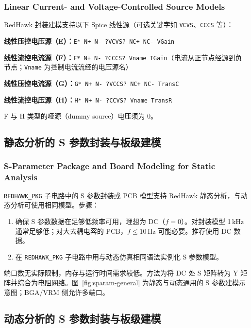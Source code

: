 \subsubsection*{Linear Current- and Voltage-Controlled Source Models}

RedHawk 封装建模支持以下 Spice 线性源（可选关键字如 \texttt{VCVS}、\texttt{CCCS} 等）：

\textbf{线性压控电压源（E）：}\texttt{E* N+ N- ?VCVS? NC+ NC- VGain}

\textbf{线性流控电流源（F）：}\texttt{F* N+ N- ?CCCS? Vname IGain}（电流从正节点经源到负节点；\texttt{Vname} 为控制电流流经的电压源名）

\textbf{线性压控电流源（G）：}\texttt{G* N+ N- ?VCCS? NC+ NC- TransC}

\textbf{线性流控电压源（H）：}\texttt{H* N+ N- ?CCVS? Vname TransR}

\begin{noteBox}
F 与 H 类型的哑源（dummy source）电压须为 0。
\end{noteBox}

\subsection{静态分析的 S 参数封装与板级建模}
\subsubsection*{S-Parameter Package and Board Modeling for Static Analysis}

\texttt{REDHAWK\_PKG} 子电路中的 S 参数封装或 PCB 模型支持 RedHawk 静态分析，与动态分析可使用相同模型。步骤：
\begin{enumerate}
  \item 确保 S 参数数据在足够低频率可用，理想为 DC（$f=0$）。对封装模型 1\,kHz 通常足够低；对大去耦电容的 PCB，$f \le 10$\,Hz 可能必要。推荐使用 DC 数据。
  \item 在 \texttt{REDHAWK\_PKG} 子电路中用与动态仿真相同语法实例化 S 参数模型。
\end{enumerate}

端口数无实际限制，内存与运行时间需求较低。方法为将 DC 处 S 矩阵转为 Y 矩阵并综合为电阻网络。图~\ref{fig:sparam-general} 为静态与动态通用的 S 参数建模示意图；BGA/VRM 侧允许多端口。


\subsection{动态分析的 S 参数封装与板级建模}
